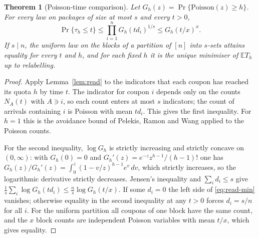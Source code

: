 \documentclass[11pt,a4paper]{article}
\newtheorem{theorem}{Theorem}[section]
\theoremstyle{remark}
\newcommand{\E}{\mathbb E}
\begin{document}
\begin{theorem}[Poisson-time comparison]\label{thm:poisson}
Let $G_h(z)=\Pr\{\mathrm{Poisson}(z)\ge h\}$. For every law on packages of size at most $s$ and every $t>0$,
\begin{equation}\label{eq:read-min}
 \Pr\{\tau_h\le t\}\le\prod_{i=1}^nG_h(td_i)^{1/s}\le G_h(t/x)^x .
\end{equation}
If $s\mid n$, the uniform law on the blocks of a partition of $[n]$ into $s$-sets attains equality for every $t$ and $h$, and for each fixed $h$ it is the unique minimiser of $\E T_h$ up to relabelling.
\end{theorem}
\begin{proof}
Apply Lemma~\ref{lem:read} to the indicators that each coupon has reached its quota $h$ by time $t$. The indicator for coupon $i$ depends only on the counts $N_A(t)$ with $A\ni i$, so each count enters at most $s$ indicators; the count of arrivals containing $i$ is Poisson with mean $td_i$. This gives the first inequality. For $h=1$ this is the avoidance bound of Pelekis, Ramon and Wang \cite[Theorem~2.6]{pelekis} applied to the Poisson counts.

For the second inequality, $\log G_h$ is strictly increasing and strictly concave on $(0,\infty)$: with $G_h(0)=0$ and $G_h'(z)=e^{-z}z^{h-1}/(h-1)!$ one has $G_h(z)/G_h'(z)=\int_0^z(1-v/z)^{h-1}e^v\,dv$, which strictly increases, so the logarithmic derivative strictly decreases. Jensen's inequality and $\sum_id_i\le s$ give $\frac1s\sum_i\log G_h(td_i)\le\frac ns\log G_h(t/x)$. If some $d_i=0$ the left side of \eqref{eq:read-min} vanishes; otherwise equality in the second inequality at any $t>0$ forces $d_i=s/n$ for all $i$. For the uniform partition all coupons of one block have the same count, and the $x$ block counts are independent Poisson variables with mean $t/x$, which gives equality.


\end{proof}
\end{document}

